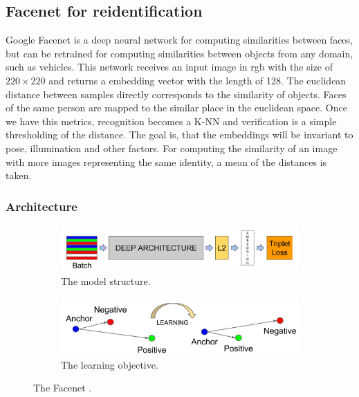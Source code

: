 \documentclass[a4paper,12pt,titlepage, twoside]{article}
\numberwithin{figure}{section}
\begin{document}
\subsection{Facenet for reidentification}
\label{sec:facenet}
Google Facenet \cite{schroff2015facenet} is a deep neural network for computing similarities between faces, but can be retrained for computing similarities between objects from any domain, such as vehicles. This network  receives an input image in rgb with the size of $220 \times 220$ and returns a embedding vector with the length of 128. The euclidean distance between samples directly corresponds to the similarity of objects. Faces of the same person are mapped to the similar place in the euclidean space. Once we have this metrics, recognition becomes a K-NN and verification is a simple thresholding of the distance. The goal is, that the embeddings will be invariant to pose, illumination and other factors. For computing the similarity of an image with more images representing the same identity, a mean of the distances is taken.

\subsubsection{Architecture}
\begin{figure}
    \begin{subfigure}[Sample1]{0.5\linewidth}
    	\includegraphics[width=0.95\linewidth]{fig/facenet.png} 
        \caption{The model structure.}
        \label{fig:facenet_structure}
    \end{subfigure}
    \quad
    \begin{subfigure}[Sample1]{0.5\linewidth} 
    	\includegraphics[width=0.95\linewidth]{fig/triplet_loss.png}
        \caption{The learning objective.}   
        \label{fig:triplet_loss}
    \end{subfigure}
    \caption{The Facenet \cite{schroff2015facenet}.}
\end{figure}
\end{document}
